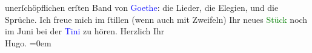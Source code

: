                     unerſchöpflichen erſten Band von \textcolor{blue}{Goethe}{}\ledrightnote{\textcolor{blue}{Johann Wolfgang von Goethe}}: die
                    Lieder, die Elegien, und die Sprüche. Ich freue mich im ſtillen (wenn auch mit
                    Zweifeln) Ihr neues \textcolor{green}{Stück}{}
                    noch im Juni bei der \textcolor{blue}{Tini}{}\ledrightnote{\textcolor{blue}{Christine Schönberger}} zu
                    hören.\pend
           \pstart
           Herzlich Ihr{\\[\baselineskip]}\spacefill\mbox{Hugo.}\pend
           \leftskip=0em{}\endnumbering{}  
      